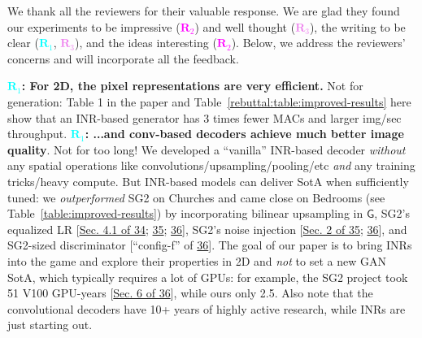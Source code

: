 \documentclass[rebuttal]{cvpr}
\newcommand{\G}{\mathsf{G}}
\newcommand{\ReviewerA}{\textcolor{cyan}{$\bm R_1$}}
\newcommand{\ReviewerB}{\textcolor{magenta}{$\bm R_2$}}
\newcommand{\ReviewerC}{\textcolor{violet}{$\bm R_3$}}
\newcommand{\ReviewerAsays}[1]{\textbf{\ReviewerA: \textbf{#1}}}
\begin{document}
\thispagestyle{empty}

We thank all the reviewers for their valuable response. We are glad they found our experiments to be impressive (\ReviewerB) and well thought (\ReviewerC), the writing to be clear (\ReviewerA, \ReviewerC), and the ideas interesting (\ReviewerB).
Below, we address the reviewers' concerns and will incorporate all the feedback.

\ReviewerAsays{For 2D, the pixel representations are very efficient.}
Not for generation:
Table 1 in the paper and Table~\ref{rebuttal:table:improved-results} here show that an INR-based generator has $3$ times fewer MACs and larger img/sec throughput. \ReviewerAsays{...and conv-based decoders achieve much better image quality}.
Not for too long!
We developed a ``vanilla'' INR-based decoder \textit{without} any spatial operations like convolutions/upsampling/pooling/etc \textit{and} any training tricks/heavy compute.
But INR-based models can deliver SotA when sufficiently tuned: we \textit{outperformed} SG2 on Churches and came close on Bedrooms (see Table~\ref{table:improved-results})
by incorporating bilinear upsampling in $\G$, SG2's equalized LR [\href{https://arxiv.org/abs/1710.10196}{Sec. 4.1 of 34}; \href{https://arxiv.org/abs/1812.04948}{35}; \href{https://arxiv.org/abs/1912.04958}{36}], SG2's noise injection [\href{https://arxiv.org/abs/1812.04948}{Sec. 2 of 35}; \href{https://arxiv.org/abs/1912.04958}{36}], and SG2-sized discriminator [``config-f'' of \href{https://arxiv.org/abs/1912.04958}{36}].
The goal of our paper is to bring INRs into the game and explore their properties in 2D and \textit{not} to set a new GAN SotA, which typically requires a lot of GPUs: for example, the SG2 project took 51 V100 GPU-years [\href{https://arxiv.org/abs/1912.04958}{Sec. 6 of 36}], while ours only 2.5.
Also note that the convolutional decoders have 10+ years of highly active research, while INRs are just starting out.

\begin{table}
\caption{FID scores for additional ablations of our multi-scale INR-based GAN (INR-GAN).
Removing $\sigma(x)$ from FMM \textit{worsens} the scores.
Incorporating StyleGAN2's architecture and bilinear upsampling allows the INR-based generator to rival its convolution-based counterpart.
Img/sec of $\G$ is measured on 1 NVidia V100 32GB.}
\label{table:improved-results}
\centering
{}
\end{table}
 
\end{document}
